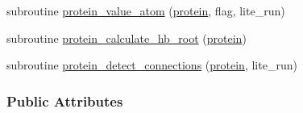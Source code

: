 \begin{DoxyCompactItemize}
\item 
subroutine \hyperlink{classcalc__xscore_a5a5ffe118d359c23175fcd5fdff1c5d6}{protein\-\_\-value\-\_\-atom} (\hyperlink{classcalc__xscore_a98803b585e24ba9794bf16dc263374dc}{protein}, flag, lite\-\_\-run)
\item 
subroutine \hyperlink{classcalc__xscore_a8203571f0fda8078d3d5804e560f546a}{protein\-\_\-calculate\-\_\-hb\-\_\-root} (\hyperlink{classcalc__xscore_a98803b585e24ba9794bf16dc263374dc}{protein})
\item 
subroutine \hyperlink{classcalc__xscore_a7ab444036cc1bc45a37f652a06b72b9b}{protein\-\_\-detect\-\_\-connections} (\hyperlink{classcalc__xscore_a98803b585e24ba9794bf16dc263374dc}{protein}, lite\-\_\-run)
\end{DoxyCompactItemize}
\subsubsection*{Public Attributes}
